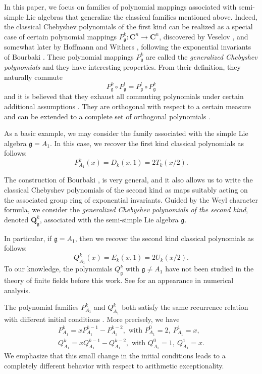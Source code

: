 \documentclass{amsart}
\newcommand{\mf}{\mathfrak}
\newcommand{\C}{\mathbf C}
\newcommand{\Q}{\mathbf Q}
\numberwithin{equation}{section}
\theoremstyle{plain}
\theoremstyle{definition}
\begin{document}
In this paper, we focus on families of polynomial mappings associated with semi-simple Lie algebras that generalize the classical families mentioned above. Indeed, the classical Chebyshev polynomials of the first kind can be realized as a special case of certain polynomial mappings $P_\mathfrak{g}^k:\C^n \rightarrow \C^n$, discovered by Veselov \cite{veselov1987}, and somewhat later by Hoffmann and Withers \cite{hoffmanwithers1988}, following the exponential invariants of Bourbaki \cite{bourbaki2002}. These polynomial mappings $P_\mathfrak{g}^k$ are called the \textit{generalized Chebyshev polynomials} and they have interesting properties. From their definition, they naturally commute
\[P_{\mf{g}}^k \circ P_{\mf{g}}^l = P_{\mf{g}}^l \circ P_{\mf{g}}^k\]
and it is believed that they exhaust all commuting polynomials under certain additional assumptions \cite{veselov-survey1991}. They are orthogonal with respect to a certain measure and can be extended to a complete set of orthogonal polynomials \cite{hoffmanwithers1988}. 

As a basic example, we may consider the family associated with the simple Lie algebra $\mathfrak{g}=A_1$. In this case, we recover the first kind classical polynomials as follows:
\[P_{A_1}^k(x)= D_k(x,1) = 2T_k(x/2).\]
	
The construction of Bourbaki \cite{bourbaki2002}, is very general, and it also allows us to write the classical Chebyshev polynomials of the second kind as maps suitably acting on the associated group ring of exponential invariants. Guided by the Weyl character formula, we consider the \textit{generalized Chebyshev polynomials of the second kind}, denoted $\Q_{\mf{g}}^k$, associated with the semi-simple Lie algebra $\mf{g}$.

In particular, if $\mathfrak{g}=A_1$, then we recover the second kind classical polynomials as follows:
\[Q_{A_1}^k(x)= E_k(x,1) = 2U_k(x/2).\]
To our knowledge, the polynomials $Q^k_{\mf{g}}$ with $\mf{g}\neq A_1$ have not been studied in the theory of finite fields before this work. See \cite[$\S$ 3.3]{hubertsinger2022} for an appearance in numerical analysis.

The polynomial families $P_{A_1}^k$ and $Q_{A_1}^k$ both satisfy the same recurrence relation with different initial conditions \cite{friedlidl1987}. More precisely, we have
\begin{equation}\label{eq:PQA1recursions}
	\begin{gathered}
		P^k_{A_1}=xP^{k-1}_{A_1}-P^{k-2}_{A_1},\text{ with }P^0_{A_1}=2,\ P^1_{A_1}=x,\\
		Q^k_{A_1}=xQ^{k-1}_{A_1}-Q^{k-2}_{A_1},\text{ with }Q^0_{A_1}=1,\ Q^1_{A_1}=x.
	\end{gathered}
\end{equation}
We emphasize that this small change in the initial conditions leads to a completely different behavior with respect to arithmetic exceptionality.
\end{document}
